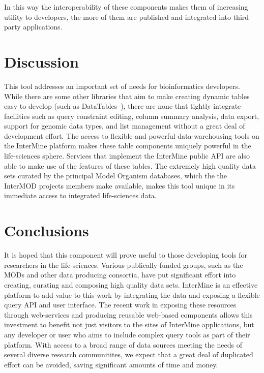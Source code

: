 \documentclass[10pt,a4paper,twocolumn]{article}
\begin{document}
In this way the interoperability of these components makes them of increasing
utility to developers, the more of them are published and integrated into third
party applications.

\section*{Discussion}

This tool addresses an important set of needs for bioinformatics developers.
While there are some other libraries that aim to make creating dynamic tables
easy to develop (such as DataTables~\cite{site:datatables}), there are none that
tightly integrate facilities such as query constraint editing, column summary
analysis, data export, support for genomic data types, and list management
without a great deal of development effort. The access to flexible and powerful
data-warehousing tools on the InterMine platform makes these table components
uniquely powerful in the life-sciences sphere. Services that implement the
InterMine public API are also able to make use of the features of these tables.
The extremely high quality data sets curated by the principal Model Organism
databases, which the the InterMOD projects members make available, makes this
tool unique in its immediate access to integrated life-sciences data. 

\section*{Conclusions}

It is hoped that this component will prove useful to those developing tools for
researchers in the life-sciences. Various publically funded groups, such as the
MODs and other data producing consortia, have put significant effort into
creating, curating and composing high quality data sets. InterMine is an
effective platform to add value to this work by integrating the data and
exposing a flexible query API and user interface. The recent work in exposing
these resources through web-services and producing reusable web-based components
allows this investment to benefit not just visitors to the sites of InterMine
applications, but any developer or user who aims to include complex query tools
as part of their platform. With access to a broad range of data sources meeting
the needs of several diverse research communitites, we expect that a great deal
of duplicated effort can be avoided, saving significant amounts of time and
money.
\end{document}
